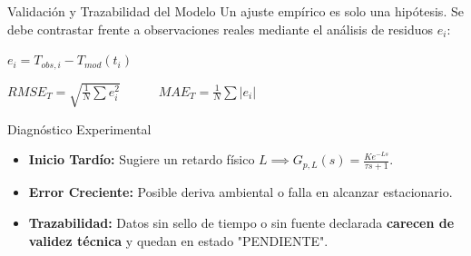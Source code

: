 \documentclass[aspectratio=169, xcolor={table,xcdraw}]{beamer}
\begin{document}
\begin{frame}{Validación y Trazabilidad del Modelo}
    Un ajuste empírico es solo una hipótesis. Se debe contrastar frente a observaciones reales mediante el análisis de residuos $e_i$:
    
    \vspace{0.2cm}
    {\centering $\displaystyle e_i = T_{obs,i} - T_{mod}(t_i)$ \par}
    \vspace{0.2cm}
    {\centering $\displaystyle RMSE_T = \sqrt{\frac{1}{N}\sum e_i^2} \quad \quad \quad MAE_T = \frac{1}{N}\sum \vert{}e_i\vert{}$ \par}
    
    \vspace{0.4cm}
    \begin{alertblock}{Diagnóstico Experimental}
        \footnotesize
        \begin{itemize}
            \item \textbf{Inicio Tardío:} Sugiere un retardo físico $L \implies G_{p,L}(s) = \frac{K e^{-Ls}}{\tau s + 1}$.
            \item \textbf{Error Creciente:} Posible deriva ambiental o falla en alcanzar estacionario.
            \item \textbf{Trazabilidad:} Datos sin sello de tiempo o sin fuente declarada \textbf{carecen de validez técnica} y quedan en estado "PENDIENTE".
        \end{itemize}
    \end{alertblock}
\end{frame}
\end{document}
